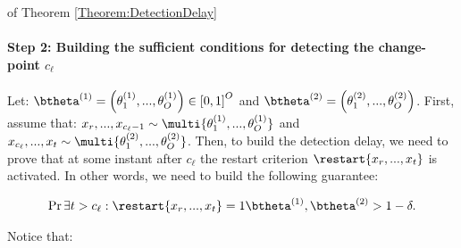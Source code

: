 \documentclass{article} %
\begin{document}
\begin{myproof}{of Theorem \ref{Theorem:DetectionDelay}}
	
	\paragraph{Step 2: Building the sufficient conditions for detecting the change-point $c_\ell$}
 Let: $\btheta^{(1)}  = \left(\theta^{(1)}_1,..., \theta^{(1)}_O \right) \in \left[0,1\right]^O$ and
$\btheta^{(2)}  = \left(\theta^{(2)}_1,..., \theta^{(2)}_O \right)$. 
	First, assume that: $x_r,...,x_{c_\ell-1}\sim \multi{\theta^{(1)}_1,..., \theta^{(1)}_O}$ and $x_{c_\ell},...,x_{t}\sim \multi{\theta^{(2)}_1,..., \theta^{(2)}_O}$. 
	Then, to build the detection delay, we need to prove that at some instant after $c_\ell$ the restart criterion $\restart{x_r,...,x_t}$ is activated. In other words, we need to build the following guarantee:
	
	\begin{align*}
	\Pr{ \exists t > c_\ell: \restart{x_r,...,x_t} = 1 }{\btheta^{(1)},\btheta^{(2)}} > 1-\delta.
	\end{align*}
	
	Notice that:
	

\end{myproof}
\end{document}
